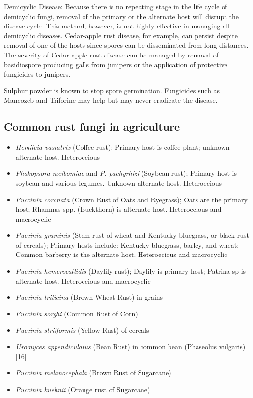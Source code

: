 \documentclass[
  openany]{book}
\providecommand{\tightlist}{%
  \setlength{\itemsep}{0pt}\setlength{\parskip}{0pt}}
\begin{document}
Demicyclic Disease: Because there is no repeating stage in the life cycle of demicyclic fungi, removal of the primary or the alternate host will disrupt the disease cycle. This method, however, is not highly effective in managing all demicyclic diseases. Cedar-apple rust disease, for example, can persist despite removal of one of the hosts since spores can be disseminated from long distances. The severity of Cedar-apple rust disease can be managed by removal of basidiospore producing galls from junipers or the application of protective fungicides to junipers.

Sulphur powder is known to stop spore germination. Fungicides such as Mancozeb and Triforine may help but may never eradicate the disease.

\hypertarget{common-rust-fungi-in-agriculture}{%
\subsection{Common rust fungi in agriculture}\label{common-rust-fungi-in-agriculture}}

\begin{itemize}
\tightlist
\item
  \emph{Hemileia vastatrix} (Coffee rust); Primary host is coffee plant; unknown alternate host. Heteroecious
\item
  \emph{Phakopsora meibomiae} and \emph{P. pachyrhizi} (Soybean rust); Primary host is soybean and various legumes. Unknown alternate host. Heteroecious
\item
  \emph{Puccinia coronata} (Crown Rust of Oats and Ryegrass); Oats are the primary host; Rhamnus spp. (Buckthorn) is alternate host. Heteroecious and macrocyclic
\item
  \emph{Puccinia graminis} (Stem rust of wheat and Kentucky bluegrass, or black rust of cereals); Primary hosts include: Kentucky bluegrass, barley, and wheat; Common barberry is the alternate host. Heteroecious and macrocyclic
\item
  \emph{Puccinia hemerocallidis} (Daylily rust); Daylily is primary host; Patrina sp is alternate host. Heteroecious and macrocyclic
\item
  \emph{Puccinia triticina} (Brown Wheat Rust) in grains
\item
  \emph{Puccinia sorghi} (Common Rust of Corn)
\item
  \emph{Puccinia striiformis} (Yellow Rust) of cereals
\item
  \emph{Uromyces appendiculatus} (Bean Rust) in common bean (Phaseolus vulgaris){[}16{]}
\item
  \emph{Puccinia melanocephala} (Brown Rust of Sugarcane)
\item
  \emph{Puccinia kuehnii} (Orange rust of Sugarcane)
\end{itemize}
\end{document}
